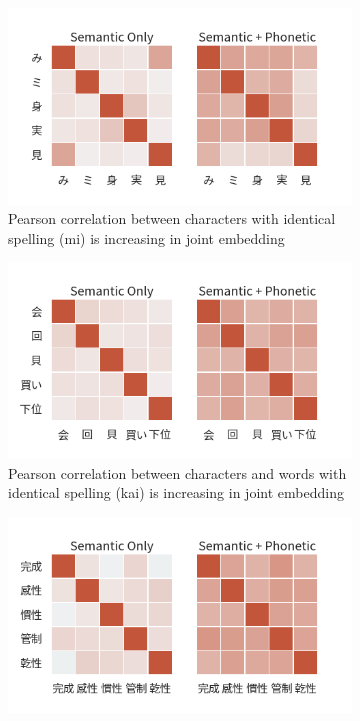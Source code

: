 \begin{figure}[t]
    \centering
    \begin{subfigure}[b]{0.49\textwidth}
        \centering
        \includegraphics[width=\textwidth]{../images/corr_ja1.png}
        \caption{Pearson correlation between characters with identical spelling (mi) is increasing in joint embedding}
        \label{fig:corr_ja1}
    \end{subfigure}
    \hfill
    \begin{subfigure}[b]{0.49\textwidth}
        \centering
        \includegraphics[width=\textwidth]{../images/corr_ja2.png}
        \caption{Pearson correlation between characters and words with identical spelling (kai) is increasing in joint embedding}
        \label{fig:corr_ja2}
    \end{subfigure}
    \begin{subfigure}[b]{0.49\textwidth}
        \centering
        \includegraphics[width=\textwidth]{../images/corr_ja3.png}

\end{subfigure}
\end{figure}
